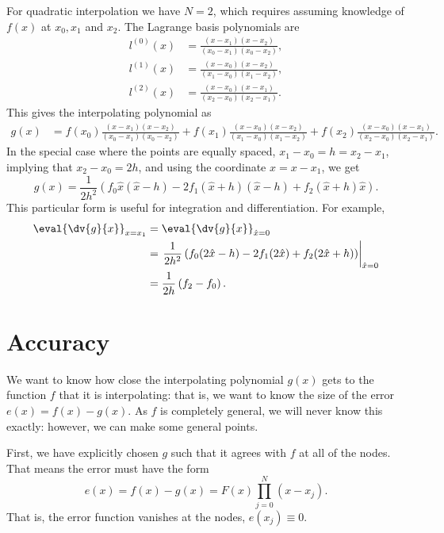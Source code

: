For quadratic interpolation we have $N=2$, which requires assuming knowledge of $f(x)$ at $x_0, x_1$ and $x_2$. The Lagrange basis polynomials are
%
\begin{align}
  l^{(0)}(x) &= \frac{(x - x_1)(x - x_2)}{(x_0 - x_1)(x_0 - x_2)}, \\
  l^{(1)}(x) &= \frac{(x - x_0)(x - x_2)}{(x_1 - x_0)(x_1 - x_2)}, \\
  l^{(2)}(x) &= \frac{(x - x_0)(x - x_1)}{(x_2 - x_0)(x_2 - x_1)}.
\end{align}
%
This gives the interpolating polynomial as
%
\begin{align}
  g(x) &= f(x_0) \frac{(x - x_1)(x - x_2)}{(x_0 - x_1)(x_0 - x_2)} + f(x_1) \frac{(x - x_0)(x - x_2)}{(x_1 - x_0)(x_1 - x_2)} + f(x_2) \frac{(x - x_0)(x - x_1)}{(x_2 - x_0)(x_2 - x_1)}.
\end{align}
%
In the special case where the points are equally spaced, $x_1 - x_0 = h = x_2 - x_1$, implying that $x_2 - x_0 = 2 h$, and using the coordinate $\hat{x} = x - x_1$, we get
%
\begin{equation}
  g(x) = \frac{1}{2 h^2} \left( f_0 \hat{x} (\hat{x} - h) - 2 f_1 (\hat{x} + h) (\hat{x} - h) + f_2 (\hat{x} + h) \hat{x} \right).
\end{equation}
%
This particular form is useful for integration and differentiation. For example,
%
\begin{align}
  \eval{\dv{g}{x}}_{x = x_1} &= \eval{\dv{g}{x}}_{\hat{x} = 0} \\
  &= \left. \frac{1}{2 h^2} \left( f_0 (2 \hat{x} - h) - 2 f_1 (2 \hat{x}) + f_2 (2 \hat{x} + h) \right) \right|_{\hat{x} = 0} \\
  &= \frac{1}{2 h} \left( f_2 - f_0 \right).
\end{align}

\section{Accuracy}

We want to know how close the interpolating polynomial $g(x)$ gets to the function $f$ that it is interpolating: that is, we want to know the size of the error $e(x) = f(x) - g(x)$. As $f$ is completely general, we will never know this exactly: however, we can make some general points.

First, we have explicitly chosen $g$ such that it agrees with $f$ at all of the nodes. That means the error must have the form
%
\begin{equation}
  e(x) = f(x) - g(x) = F(x) \prod_{j=0}^N (x - x_j).
\end{equation}
%
That is, the error function vanishes at the nodes, $e(x_j) \equiv 0$.

